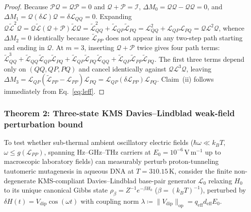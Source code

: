 \documentclass[10pt,letterpaper]{article}
\theoremstyle{plain}
\theoremstyle{definition}
\newcommand{\Lcal}{\mathcal{L}}
\newcommand{\Qcal}{\mathcal{Q}}
\newcommand{\Pcal}{\mathcal{P}}
\begin{document}
\begin{proof}
Because $\Pcal\Qcal = \Qcal\Pcal = 0$ and $\Qcal + \Pcal = \mathcal{I}$, $\Delta M_0 = \Qcal\Qcal - \Qcal\Qcal = 0$, and $\Delta M_1 = \Qcal(\delta\Lcal)\Qcal = \delta\Lcal_{QQ} = 0$. Expanding $\Qcal\widetilde{\Lcal}^2\Qcal = \Qcal\widetilde{\Lcal}(\Qcal + \Pcal)\widetilde{\Lcal}\Qcal = \widetilde{\Lcal}_{QQ}^2 + \widetilde{\Lcal}_{QP}\widetilde{\Lcal}_{PQ} = \Lcal_{QQ}^2 + \Lcal_{QP}\Lcal_{PQ} = \Qcal\Lcal^2\Qcal$, whence $\Delta M_2 = 0$ identically because $\widetilde{\Lcal}_{PP}$ does not appear in any two-step path starting and ending in $\Qcal$. At $m=3$, inserting $\Qcal + \Pcal$ twice gives four path terms: $\widetilde{\Lcal}_{QQ}^3 + \widetilde{\Lcal}_{QQ}\widetilde{\Lcal}_{QP}\widetilde{\Lcal}_{PQ} + \widetilde{\Lcal}_{QP}\widetilde{\Lcal}_{PQ}\widetilde{\Lcal}_{QQ} + \widetilde{\Lcal}_{QP}\widetilde{\Lcal}_{PP}\widetilde{\Lcal}_{PQ}$. The first three terms depend only on $(QQ, QP, PQ)$ and cancel identically against $\Qcal\Lcal^3\Qcal$, leaving $\Delta M_3 = \Lcal_{QP}(\widetilde{\Lcal}_{PP} - \Lcal_{PP})\Lcal_{PQ} = \Lcal_{QP}(\delta\Lcal_{PP})\Lcal_{PQ}$. Claim~(ii) follows immediately from Eq.~\eqref{eq:leff}.
\end{proof}

\subsubsection*{Theorem 2: Three-state KMS Davies--Lindblad weak-field perturbation bound}

To test whether sub-thermal ambient oscillatory electric fields ($\hbar\omega \ll k_B T$, $\omega \le g(\Lcal_{PP})$, spanning $\mathrm{Hz}$--$\mathrm{GHz}$--$\mathrm{THz}$ carriers at $E_0 = 10^{-6}\,\mathrm{V\,m^{-1}}$ \cite{garcia2026dna} up to macroscopic laboratory fields) can measurably perturb proton-tunneling tautomeric mutagenesis in aqueous DNA at $T = 310.15\,\mathrm{K}$, consider the finite non-degenerate KMS-compliant Davies--Lindblad base-pair generator $\Lcal_0$ relaxing $H_0$ to its unique canonical Gibbs state $\rho_{\beta} = Z^{-1} e^{-\beta H_0}$ ($\beta = (k_B T)^{-1}$), perturbed by $\delta H(t) = V_{\mathrm{dip}} \cos(\omega t)$ with coupling norm $\lambda \coloneqq \|V_{\mathrm{dip}}\|_{\mathrm{op}} = q_{\mathrm{eff}} d_{\mathrm{eff}} E_0$.
\end{document}

